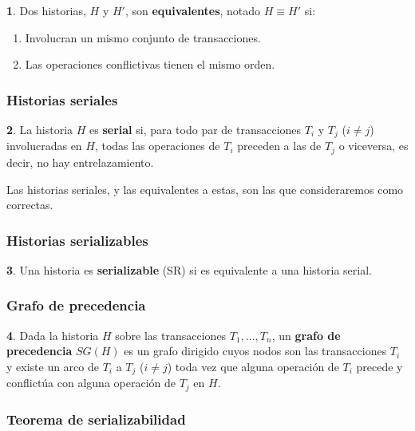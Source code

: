 \documentclass[english,titlepage]{article}
\theoremstyle{definition}
\theoremstyle{definition}
\newtheorem*{defn*}{\protect\definitionname}
\providecommand{\definitionname}{Definición}
\begin{document}
\begin{defn*}
Dos historias, $H$ y $H'$, son \textbf{equivalentes}, notado $H \equiv H'$ si:

\begin{enumerate}
    \item Involucran un mismo conjunto de transacciones.
    \item Las operaciones conflictivas tienen el mismo orden.
\end{enumerate}
\end{defn*}

\subsubsection{Historias seriales}

\begin{defn*}
La historia $H$ es \textbf{serial} si, para todo par de transacciones $T_i$ y
$T_j$ ($i \not= j$) involucradas en $H$, todas las operaciones de $T_i$
preceden a las de $T_j$ o viceversa, es decir, no hay entrelazamiento.
\end{defn*}

Las historias seriales, y las equivalentes a estas, son las que consideraremos
como correctas.

\subsubsection{Historias serializables}

\begin{defn*}
Una historia es \textbf{serializable} (SR) si es equivalente a una historia
serial.
\end{defn*}

\subsubsection{Grafo de precedencia}

\begin{defn*}
Dada la historia $H$ sobre las transacciones $T_1, \dots, T_n$, un
\textbf{grafo de precedencia} $SG(H)$ es un grafo dirigido cuyos nodos son las
transacciones $T_i$ y existe un arco de $T_i$ a $T_j$ ($i \not= j$) toda vez
que alguna operación de $T_i$ precede y conflictúa con alguna operación de
$T_j$ en $H$.
\end{defn*}

\subsubsection{Teorema de serializabilidad}
\end{document}
